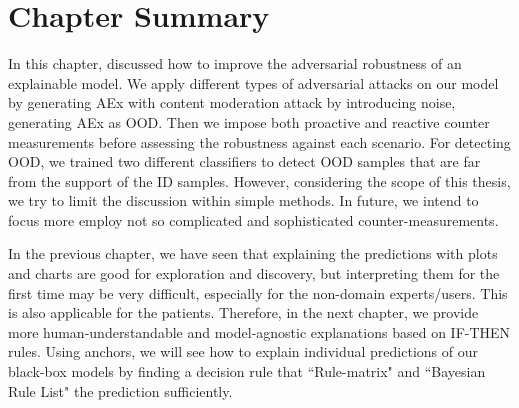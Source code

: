 

\section{Chapter Summary} \label{chapter_6:conclusion}
In this chapter, discussed how to improve the adversarial robustness of an explainable model. We apply different types of adversarial attacks on our model by generating AEx with content moderation attack by introducing noise, generating AEx as OOD. Then we impose both proactive and reactive counter measurements before assessing the robustness against each scenario. 
For detecting OOD, we trained two different classifiers to detect OOD samples that are far from the support of the ID samples. However, considering the scope of this thesis, we try to limit the discussion within simple methods. In future, we intend to focus more employ not so complicated and sophisticated counter-measurements. 


\hspace*{3.5mm} In the previous chapter, we have seen that explaining the predictions with plots and charts are good for exploration and discovery, but interpreting them for the first time may be very difficult, especially for the non-domain experts/users. This is also applicable for the patients. Therefore, in the next chapter, we provide more human-understandable and model-agnostic explanations based on IF-THEN rules. Using anchors, we will see how to explain individual predictions of our black-box models by finding a decision rule that ``Rule-matrix" and ``Bayesian Rule List" the prediction sufficiently. 

